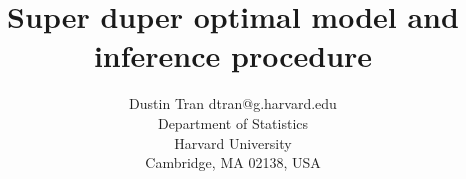 \documentclass[twoside,11pt]{article}
\begin{document}
\title{Super duper optimal model and inference procedure}
\author{\name Dustin Tran \email dtran@g.harvard.edu\\
\addr Department of Statistics\\
Harvard University\\
Cambridge, MA 02138, USA
}

\editor{}

\maketitle
\begin{abstract}%
\end{abstract}

\begin{keywords}
\end{keywords}

\nocite{*}

\end{document}
